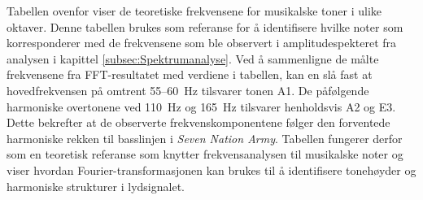 \begin{table}[H]
    \centering
    \caption{Frekvenstabell for musikalske toner oppgitt i hertz [Hz] \parencite{seventhstring_notefrequencies}}
    \vspace{0.5ex}
    \label{tab:frekvenstabell}
\end{table}

Tabellen ovenfor viser de teoretiske frekvensene for musikalske toner i ulike oktaver. 
Denne tabellen brukes som referanse for å identifisere hvilke noter som korresponderer med 
de frekvensene som ble observert i amplitudespekteret fra analysen i kapittel \ref{subsec:Spektrumanalyse}. 
Ved å sammenligne de målte frekvensene fra FFT-resultatet med verdiene i tabellen, kan en 
slå fast at hovedfrekvensen på omtrent 55--60~Hz tilsvarer tonen A1. De påfølgende 
harmoniske overtonene ved 110~Hz og 165~Hz tilsvarer henholdsvis A2 og E3. 
Dette bekrefter at de observerte frekvenskomponentene følger den forventede harmoniske 
rekken til basslinjen i \textit{Seven Nation Army}. Tabellen fungerer derfor som en teoretisk 
referanse som knytter frekvensanalysen til musikalske noter og viser hvordan Fourier-transformasjonen 
kan brukes til å identifisere tonehøyder og harmoniske strukturer i lydsignalet.




